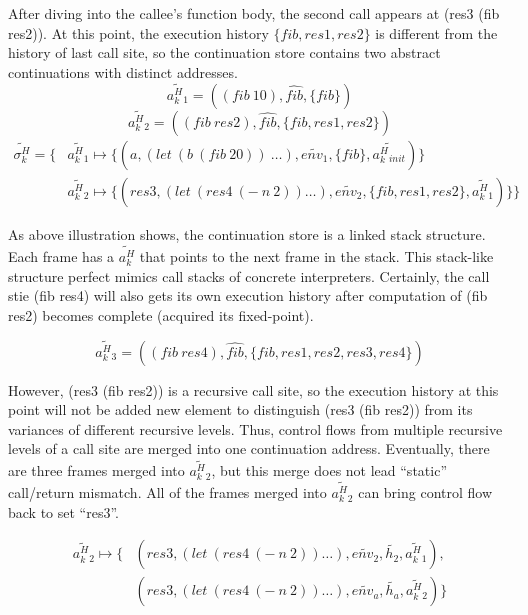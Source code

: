 \documentclass{article}
\begin{document}
After diving into the callee's function body, the second call appears at (res3 (fib res2)). At this point, the execution history $\{fib, res1, res2\}$ is different from the history of last call site, so the continuation store contains two abstract continuations with distinct addresses.
\[
\widetilde{a^H_k{}_1} = ((fib\ 10), \widehat{fib}, \{fib\})
\]
\[
\widetilde{a^H_k{}_2} = ((fib\ res2), \widehat{fib}, \{fib, res1, res2\})
\]
\[
\begin{aligned}
\label{eq:show-stack}
\widetilde{\sigma_k^H} = \{ {}& \widetilde{a^H_k{}_1} \mapsto \{(a, (let\ (b\ (fib\ 20))\ \dots), \widetilde{env_1}, \{fib\}, \widetilde{a^H_k{}_{init}})\}  {} \\
                              & \widetilde{a^H_k{}_2} \mapsto \{(res3, (let\ (res4\ (-\ n\ 2)) \dots), \widetilde{env_2}, \{fib, res1, res2\}, \widetilde{a^H_k{}_1})\} \}
\end{aligned}
\]

As above illustration shows, the continuation store is a linked stack structure. Each frame has a $\widetilde{a^H_k}$ that points to the next frame in the stack. This stack-like structure perfect mimics call stacks of concrete interpreters. Certainly, the call stie (fib res4) will also gets its own execution history after computation of (fib res2) becomes complete (acquired its fixed-point).

\[
\widetilde{a^H_k{}_3} = ((fib\ res4), \widehat{fib}, \{fib, res1, res2, res3, res4\})
\]

However, (res3 (fib res2)) is a recursive call site, so the execution history at this point will not be added new element to distinguish (res3 (fib res2)) from its variances of different recursive levels. Thus, control flows from multiple recursive levels of a call site are merged into one continuation address. Eventually, there are three frames merged into $\widetilde{a^H_k{}_2}$, but this merge does not lead ``static'' call/return mismatch. All of the frames merged into $\widetilde{a^H_k{}_2}$ can bring control flow back to set ``res3''.

\[
\begin{aligned}
\label{eq:show-stack}
\widetilde{a^H_k{}_2} \mapsto \{ {}& (res3, (let\ (res4\ (-\ n\ 2)) \dots), \widetilde{env_2}, \tilde{h_2}, \widetilde{a^H_k{}_1}), {} \\
                                 {}& (res3, (let\ (res4\ (-\ n\ 2)) \dots), \widetilde{env_a}, \tilde{h_a}, \widetilde{a^H_k{}_2}) \}
\end{aligned}
\]
\end{document}

